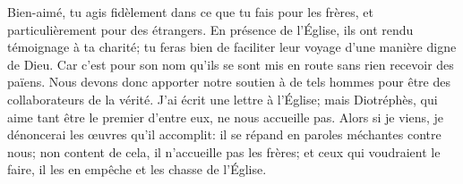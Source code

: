 Bien-aimé, tu agis fidèlement dans ce que tu fais pour les frères,
	et particulièrement pour des étrangers.
En présence de l’Église, ils ont rendu témoignage à ta charité;
	tu feras bien de faciliter leur voyage d’une manière digne de Dieu.
Car c’est pour son nom qu’ils se sont mis en route sans rien recevoir des païens.
Nous devons donc apporter notre soutien à de tels hommes
	pour être des collaborateurs de la vérité.
J’ai écrit une lettre à l’Église;
	mais Diotréphès, qui aime tant être le premier d’entre eux, ne nous accueille pas.
Alors si je viens, je dénoncerai les œuvres qu’il accomplit:
	il se répand en paroles méchantes contre nous;
	non content de cela, il n’accueille pas les frères;
	et ceux qui voudraient le faire, il les en empêche et les chasse de l’Église.
